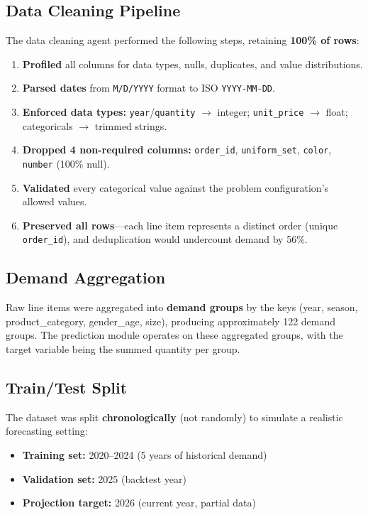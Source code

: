 \documentclass[11pt, letterpaper]{article}
\begin{document}
\subsection{Data Cleaning Pipeline}

The data cleaning agent performed the following steps, retaining \textbf{100\% of rows}:

\begin{enumerate}[nosep]
    \item \textbf{Profiled} all columns for data types, nulls, duplicates, and value distributions.
    \item \textbf{Parsed dates} from \texttt{M/D/YYYY} format to ISO \texttt{YYYY-MM-DD}.
    \item \textbf{Enforced data types:} \texttt{year}/\texttt{quantity} $\to$ integer; \texttt{unit\_price} $\to$ float; categoricals $\to$ trimmed strings.
    \item \textbf{Dropped 4 non-required columns:} \texttt{order\_id}, \texttt{uniform\_set}, \texttt{color}, \texttt{number} (100\% null).
    \item \textbf{Validated} every categorical value against the problem configuration's allowed values.
    \item \textbf{Preserved all rows}---each line item represents a distinct order (unique \texttt{order\_id}), and deduplication would undercount demand by 56\%.
\end{enumerate}

\subsection{Demand Aggregation}

Raw line items were aggregated into \textbf{demand groups} by the keys (year, season, product\_category, gender\_age, size), producing approximately 122 demand groups. The prediction module operates on these aggregated groups, with the target variable being the summed quantity per group.

\subsection{Train/Test Split}

The dataset was split \textbf{chronologically} (not randomly) to simulate a realistic forecasting setting:
\begin{itemize}[nosep]
    \item \textbf{Training set:} 2020--2024 (5 years of historical demand)
    \item \textbf{Validation set:} 2025 (backtest year)
    \item \textbf{Projection target:} 2026 (current year, partial data)
\end{itemize}
\end{document}
